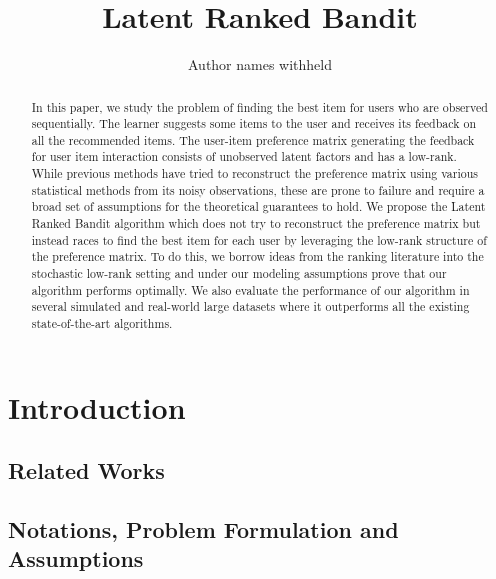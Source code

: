 \documentclass[letterpaper]{article} %
\begin{document}
%
\title{Latent Ranked Bandit}
\author{Author names withheld}
\maketitle
\begin{abstract}
In this paper, we study the problem of finding the best item for users who are observed sequentially. The learner suggests some items to the user and receives its feedback on all the recommended items. The user-item preference matrix generating the feedback for user item interaction consists of unobserved latent factors and has a low-rank. While previous methods have tried to reconstruct the preference matrix using various statistical methods from its noisy observations, these are prone to failure and require a broad set of assumptions for the theoretical guarantees to hold. We propose the  Latent Ranked Bandit algorithm which does not try to reconstruct the preference matrix but instead races to find the best item for each user by leveraging the low-rank structure of the preference matrix. To do this, we borrow ideas from the ranking literature into the stochastic low-rank setting and under our modeling assumptions prove that our algorithm performs optimally. We also evaluate the performance of our algorithm in several simulated and real-world large datasets where it outperforms all the existing state-of-the-art algorithms.
\end{abstract}


\section{Introduction}
\label{intro}



\subsection{Related Works}
\label{related}


\subsection{Notations, Problem Formulation and Assumptions}

\end{document}
